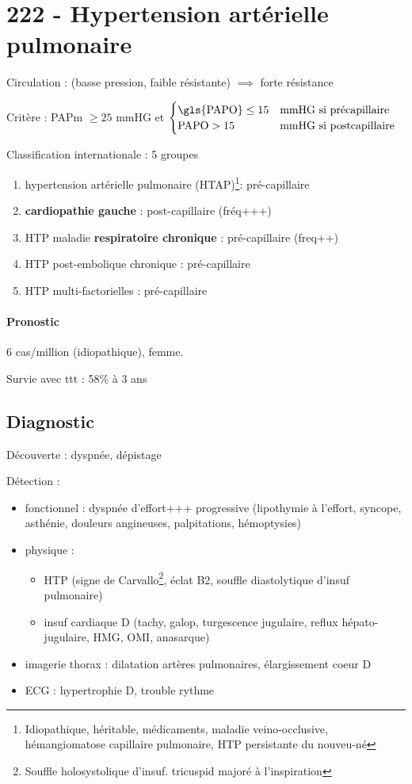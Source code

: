 \section{222 - Hypertension artérielle pulmonaire}%
\label{sec:hypertension_arterielle_pulmonaire}

Circulation : (basse pression, faible résistante) $\implies$ forte résistance

Critère : \gls{PAPm} $\ge 25$ mmHG et
$\begin{cases}
  \text{\gls{PAPO}} \le 15 & \text{mmHG si précapillaire} \\
  \text{PAPO} > 15 & \text{mmHG si postcapillaire}
  \end{cases}  $

Classification internationale : 5 groupes
\begin{enumerate}
\item hypertension artérielle pulmonaire (HTAP)\footnote{Idiopathique,
    héritable, médicaments, maladie veino-occlusive, hémangiomatose capillaire
    pulmonaire, HTP persistante du nouveu-né}: pré-capillaire
\item \textbf{cardiopathie gauche}  : post-capillaire (fréq+++)
\item HTP maladie \textbf{respiratoire chronique}  : pré-capillaire (freq++)
\item HTP post-embolique chronique : pré-capillaire
\item HTP multi-factorielles : pré-capillaire
\end{enumerate}

\paragraph{Pronostic}
6 cas/million (idiopathique), femme.

Survie avec ttt : 58\% à 3 ans

\subsection{Diagnostic}
Découverte : dyspnée, dépistage

Détection :
\begin{itemize}
\item fonctionnel : dyspnée d'effort+++ progressive (lipothymie à l'effort,
  syncope, asthénie, douleurs angineuses, palpitations, hémoptysies)
\item physique : 
  \begin{itemize}
  \item HTP (signe de Carvallo\footnote{Souffle holosystolique
    d'insuf. tricuspid majoré à l'inspiration}, éclat B2, souffle diastolytique
  d'insuf pulmonaire)
  \item insuf cardiaque D (tachy, galop, turgescence jugulaire, reflux
  hépato-jugulaire, HMG, OMI, anasarque)
  \end{itemize}
\item imagerie thorax : dilatation artères pulmonaires, élargissement coeur D
\item ECG : hypertrophie D, trouble rythme
\end{itemize}

